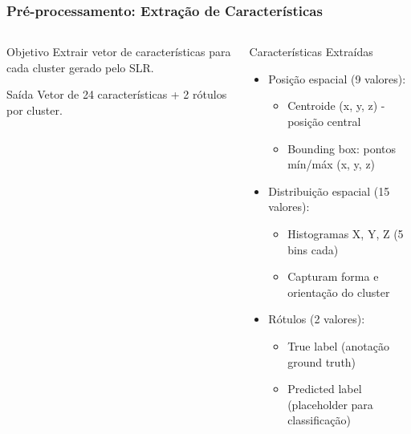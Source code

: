 \documentclass[aspectratio=169,t,xcolor=table]{beamer}
\begin{document}
\begin{frame}
    \frametitle{Pré-processamento: Extração de Características}
    \begin{columns}[T]
        \begin{column}{.4\textwidth}
            \begin{block}{Objetivo}
                \vspace{1.5em}
                Extrair vetor de características para cada cluster gerado pelo SLR.
                \vspace{1.5em}
            \end{block}
            \begin{block}{Saída}
                \vspace{1.5em}
                Vetor de 24 características + 2 rótulos por cluster.
                \vspace{1.5em}
            \end{block}
        \end{column}
        \begin{column}{.6\textwidth}
            \begin{block}{Características Extraídas}
                \begin{itemize}[<+->]
                    \item Posição espacial (9 valores):
                          \begin{itemize}
                              \item Centroide (x, y, z) - posição central
                              \item Bounding box: pontos mín/máx (x, y, z)
                          \end{itemize}
                    \item Distribuição espacial (15 valores):
                          \begin{itemize}
                              \item Histogramas X, Y, Z (5 bins cada)
                              \item Capturam forma e orientação do cluster
                          \end{itemize}
                    \item Rótulos (2 valores):
                          \begin{itemize}
                              \item True label (anotação ground truth)
                              \item Predicted label (placeholder para classificação)
                          \end{itemize}
                \end{itemize}
            \end{block}
        \end{column}
    \end{columns}
\end{frame}
\end{document}

